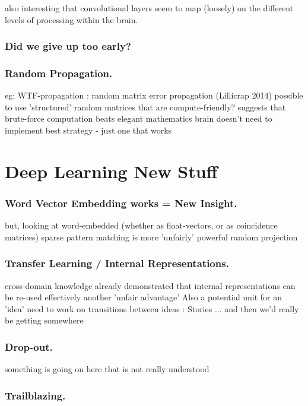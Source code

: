 \documentclass[citeauthoryear]{llncs}
\begin{document}
also interesting that convolutional layers seem to map (loosely) on the 
different levels of processing within the brain.

\subsubsection*{Did we give up too early?}
 
\subsubsection*{Random Propagation.}
    eg: WTF-propagation : random matrix error propagation (Lillicrap 2014)
      possible to use 'structured' random matrices that are compute-friendly?
      suggests that brute-force computation beats elegant mathematics
        brain doesn't need to implement best strategy - just one that works

 
\section{Deep Learning New Stuff}


\subsubsection*{Word Vector Embedding works = New Insight.}
    but, looking at word-embedded (whether as float-vectors, or as coincidence matrices)
      sparse pattern matching is more 'unfairly' powerful 
      random projection

\subsubsection*{Transfer Learning / Internal Representations.}
  cross-domain knowledge
    already demonstrated that internal representations can be re-used effectively
    another 'unfair advantage'
  Also a potential unit for an 'idea'
    need to work on transitions between ideas : Stories
      ... and then we'd really be getting somewhere


\subsubsection*{Drop-out.}
    something is going on here that is not really understood

\subsubsection*{Trailblazing.}
\end{document}
